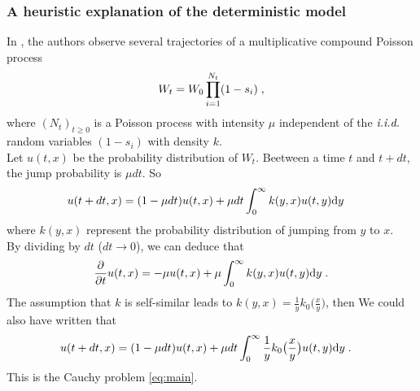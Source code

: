 \documentclass[11pt]{amsart}
\begin{document}
   \subsubsection{A heuristic explanation of the deterministic model} In \cite{robert2018mutation}, the authors observe several trajectories of a multiplicative compound Poisson process 
   \begin{equation*}
   W_t =W_0 \prod_{i = 1}^{N_t}(1 - s_i) 
   \; ,
   \end{equation*}
   where $(N_t)_{t \geq 0}$ is a Poisson process with intensity $\mu$ independent of the $\textit{i.i.d.}$ random variables $(1-s_i)$ with density $k$. \\
   Let $u(t,x)$ be the probability distribution of $W_t$. Beetween a time $t$ and $t + dt$, the jump probability is $\mu dt$. So
   \begin{align*}
       u(t + dt,x) 
       &= (1  - \mu dt) u(t,x) + \mu dt \int_0^\infty k(y,x) u (t, y) \mathrm dy
   \end{align*}
   where $k(y,x)$ represent the probability distribution of jumping from $y$ to $x$. \\
   By dividing by $dt$ ($dt \to 0$), we can deduce that
   \begin{equation*}
       \frac{\partial}{\partial t} u(t,x) 
       =   - \mu u(t,x) + \mu \int_0^\infty k(y,x) u (t, y) \mathrm dy  
       \; .
   \end{equation*}
   The assumption that $k$ is self-similar leads to $k(y,x) = \frac{1}{y}k_0\big(\frac{x}{y}\big)$, then 
   We could also have written that 
   \begin{align*}
       u(t + dt,x) 
       &= (1  - \mu dt) u(t,x) + \mu dt \int_0^\infty \frac{1}{y}k_0\big(\frac{x}{y}\big) u (t, y) \mathrm dy
       \; .
   \end{align*}
   This is the Cauchy problem \eqref{eq:main}.    
\end{document}
